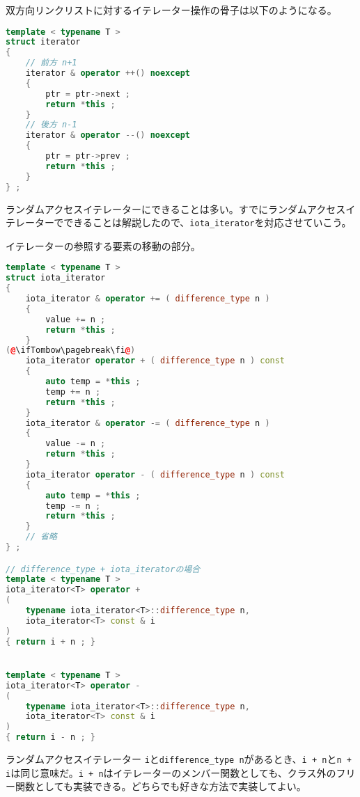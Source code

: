 双方向リンクリストに対するイテレーター操作の骨子は以下のようになる。

\begin{lstlisting}[language={C++}]
template < typename T >
struct iterator 
{
    // 前方 n+1
    iterator & operator ++() noexcept
    {
        ptr = ptr->next ;
        return *this ;
    }
    // 後方 n-1
    iterator & operator --() noexcept
    {
        ptr = ptr->prev ;
        return *this ;
    }
} ;
\end{lstlisting}


ランダムアクセスイテレーターにできることは多い。すでにランダムアクセスイテレーターでできることは解説したので、\texttt{iota\_iterator}を対応させていこう。

イテレーターの参照する要素の移動の部分。

\begin{lstlisting}[language={C++}]
template < typename T >
struct iota_iterator
{
    iota_iterator & operator += ( difference_type n )
    {
        value += n ;
        return *this ;
    }
(@\ifTombow\pagebreak\fi@)
    iota_iterator operator + ( difference_type n ) const
    {
        auto temp = *this ;
        temp += n ;
        return *this ;
    }
    iota_iterator & operator -= ( difference_type n )
    {
        value -= n ;
        return *this ;
    }
    iota_iterator operator - ( difference_type n ) const
    {
        auto temp = *this ;
        temp -= n ;
        return *this ;
    }
    // 省略
} ;

// difference_type + iota_iteratorの場合
template < typename T >
iota_iterator<T> operator +
(
    typename iota_iterator<T>::difference_type n,
    iota_iterator<T> const & i
)
{ return i + n ; }


template < typename T >
iota_iterator<T> operator - 
(
    typename iota_iterator<T>::difference_type n,
    iota_iterator<T> const & i
)
{ return i - n ; }
\end{lstlisting}

ランダムアクセスイテレーター \texttt{i}と\texttt{difference\_type n}があるとき、\texttt{i + n}と\texttt{n + i}は同じ意味だ。\texttt{i + n}はイテレーターのメンバー関数としても、クラス外のフリー関数としても実装できる。どちらでも好きな方法で実装してよい。

